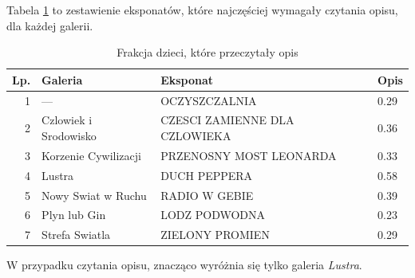 \documentclass[conference]{IEEEtran}
\begin{document}
Tabela \ref{top_opis_g} to zestawienie eksponatów, które najczęściej wymagały czytania opisu, dla każdej galerii.
\begin{table}[H]
\caption{Frakcja dzieci, które przeczytały opis}
\label{top_opis_g}
\centering
\begin{tabular}{|r|l|p{3.3cm}|l|}
\hline
\textbf{Lp.} & \textbf{Galeria} & \textbf{Eksponat} & \textbf{Opis} \\
\hline
1 &                ---    &              OCZYSZCZALNIA    & 0.29 \\
2 & Czlowiek i Srodowisko & CZESCI ZAMIENNE DLA CZLOWIEKA & 0.36 \\
3 &  Korzenie Cywilizacji &       PRZENOSNY MOST LEONARDA & 0.33 \\
4 &                Lustra &                  DUCH PEPPERA & 0.58 \\
5 &    Nowy Swiat w Ruchu &                 RADIO W GEBIE & 0.39 \\
6 &          Plyn lub Gin &                 LODZ PODWODNA & 0.23 \\
7 &        Strefa Swiatla &               ZIELONY PROMIEN & 0.29 \\
\hline
\end{tabular}
\end{table}
W przypadku czytania opisu, znacząco wyróżnia się tylko galeria \textit{Lustra}.
\end{document}
